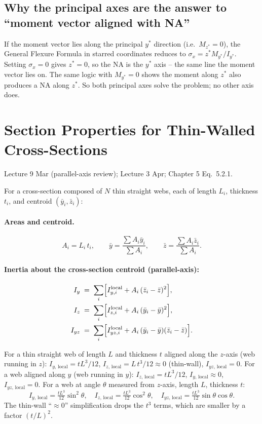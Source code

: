 \documentclass[11pt]{article}
\begin{document}
\subsection*{Why the principal axes are the answer to ``moment vector aligned with NA''}

If the moment vector lies along the principal $y^\ast$ direction (i.e.\ $M_{z^\ast} = 0$), the General Flexure Formula in starred coordinates reduces to $\sigma_x = z^\ast M_{y^\ast} / I_{y^\ast}$. Setting $\sigma_x = 0$ gives $z^\ast = 0$, so the NA is the $y^\ast$ axis -- the same line the moment vector lies on. The same logic with $M_{y^\ast} = 0$ shows the moment along $z^\ast$ also produces a NA along $z^\ast$. So both principal axes solve the problem; no other axis does.

\section{Section Properties for Thin-Walled Cross-Sections}

\begin{citebox}{Lecture 9 Mar (parallel-axis review); Lecture 3 Apr; Chapter 5 Eq.~5.2.1.}
\end{citebox}

For a cross-section composed of $N$ thin straight webs, each of length $L_i$, thickness $t_i$, and centroid $(\bar y_i, \bar z_i)$:

\paragraph{Areas and centroid.}
$$A_i = L_i\, t_i, \qquad \bar y = \dfrac{\sum A_i \bar y_i}{\sum A_i}, \qquad \bar z = \dfrac{\sum A_i \bar z_i}{\sum A_i}.$$

\paragraph{Inertia about the cross-section centroid (parallel-axis):}
\begin{align}
I_y &\;=\; \sum_i \Bigl[I_{y,i}^{\text{local}} + A_i\,(\bar z_i - \bar z)^2\Bigr],\\
I_z &\;=\; \sum_i \Bigl[I_{z,i}^{\text{local}} + A_i\,(\bar y_i - \bar y)^2\Bigr],\\
I_{yz} &\;=\; \sum_i \Bigl[I_{yz,i}^{\text{local}} + A_i\,(\bar y_i - \bar y)(\bar z_i - \bar z)\Bigr].
\end{align}

For a thin straight web of length $L$ and thickness $t$ aligned along the $z$-axis (web running in $z$): $I_{y,\,\text{local}} = t L^3 / 12$, $I_{z,\,\text{local}} = L\,t^3 / 12 \approx 0$ (thin-wall), $I_{yz,\,\text{local}} = 0$. For a web aligned along $y$ (web running in $y$): $I_{z,\,\text{local}} = t L^3 / 12$, $I_{y,\,\text{local}} \approx 0$, $I_{yz,\,\text{local}} = 0$. For a web at angle $\theta$ measured from $z$-axis, length $L$, thickness $t$:
$$I_{y,\,\text{local}} = \tfrac{tL^3}{12}\sin^2\theta, \quad I_{z,\,\text{local}} = \tfrac{tL^3}{12}\cos^2\theta, \quad I_{yz,\,\text{local}} = \tfrac{tL^3}{12}\sin\theta\cos\theta.$$
The thin-wall ``$\approx 0$'' simplification drops the $t^3$ terms, which are smaller by a factor $(t/L)^2$.
\end{document}
